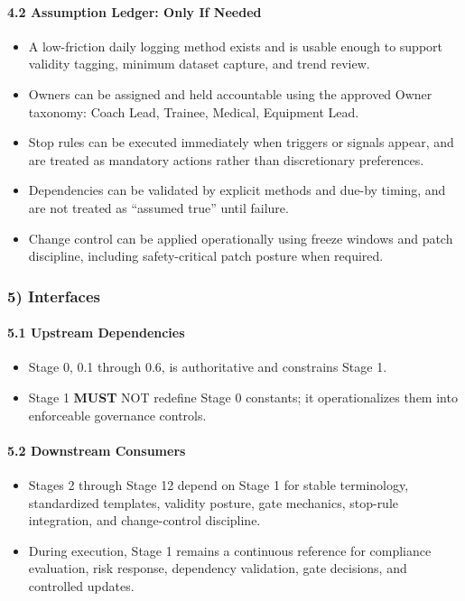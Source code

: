 \documentclass[10pt]{article}
\begin{document}
\paragraph*{4.2 Assumption Ledger: Only If Needed}

\begin{itemize}
\item A low-friction daily logging method exists and is usable enough to support validity tagging, minimum dataset capture, and trend review.
\item Owners can be assigned and held accountable using the approved Owner taxonomy: Coach Lead, Trainee, Medical, Equipment Lead.
\item Stop rules can be executed immediately when triggers or signals appear, and are treated as mandatory actions rather than discretionary preferences.
\item Dependencies can be validated by explicit methods and due-by timing, and are not treated as “assumed true” until failure.
\item Change control can be applied operationally using freeze windows and patch discipline, including safety-critical patch posture when required.
\end{itemize}

\subsubsection*{5) Interfaces}

\paragraph*{5.1 Upstream Dependencies}

\begin{itemize}
\item Stage 0, 0.1 through 0.6, is authoritative and constrains Stage 1.
\item Stage 1 \textbf{MUST} NOT redefine Stage 0 constants; it operationalizes them into enforceable governance controls.
\end{itemize}

\paragraph*{5.2 Downstream Consumers}

\begin{itemize}
\item Stages 2 through Stage 12 depend on Stage 1 for stable terminology, standardized templates, validity posture, gate mechanics, stop-rule integration, and change-control discipline.
\item During execution, Stage 1 remains a continuous reference for compliance evaluation, risk response, dependency validation, gate decisions, and controlled updates.
\end{itemize}
\end{document}
